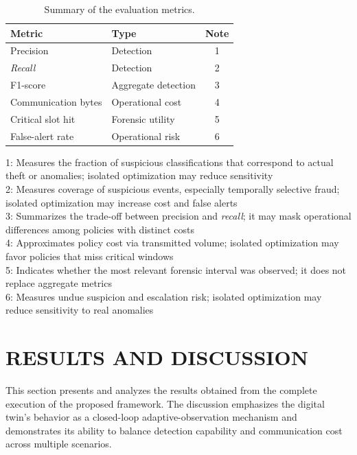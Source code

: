 \documentclass[journal]{IEEEtran}
\begin{document}
\begin{table}[!ht]
\centering
\caption{Summary of the evaluation metrics.}
\label{tab:evaluation_metrics}
\scriptsize
\begin{tabular}{p{2.35cm} p{2.25cm} c}
\hline
\textbf{Metric} & \textbf{Type} & \textbf{Note} \\
\hline
Precision & Detection & 1 \\
\textit{Recall} & Detection & 2 \\
F1-score & Aggregate detection & 3 \\
Communication bytes & Operational cost & 4 \\
Critical slot hit & Forensic utility & 5 \\
False-alert rate & Operational risk & 6 \\
\hline
\end{tabular}

\vspace{0.5mm}
\begin{minipage}{\columnwidth}
\footnotesize
1: Measures the fraction of suspicious classifications that correspond to actual theft or anomalies; isolated optimization may reduce sensitivity\\
2: Measures coverage of suspicious events, especially temporally selective fraud; isolated optimization may increase cost and false alerts\\
3: Summarizes the trade-off between precision and \textit{recall}; it may mask operational differences among policies with distinct costs\\
4: Approximates policy cost via transmitted volume; isolated optimization may favor policies that miss critical windows\\
5: Indicates whether the most relevant forensic interval was observed; it does not replace aggregate metrics\\
6: Measures undue suspicion and escalation risk; isolated optimization may reduce sensitivity to real anomalies
\end{minipage}
\end{table}

\section{RESULTS AND DISCUSSION}  \label{sec:Results_Discussion}
This section presents and analyzes the results obtained from the complete execution of the proposed framework. The discussion emphasizes the digital twin's behavior as a closed-loop adaptive-observation mechanism and demonstrates its ability to balance detection capability and communication cost across multiple scenarios.
\end{document}
